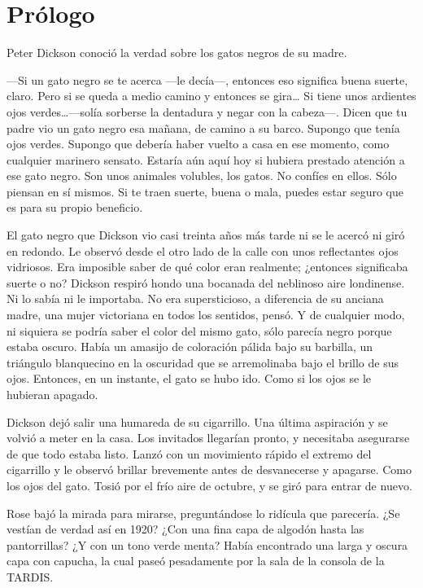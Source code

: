 \chapter*{Prólogo}

{Peter Dickson conoció la verdad sobre los gatos negros de su madre.}

{---Si un gato negro se te acerca ---le decía---, entonces eso
	significa buena suerte, claro. Pero si se queda a medio camino y
	entonces se gira\ldots{} Si tiene unos ardientes ojos
	verdes\ldots{}---solía sorberse la dentadura y negar con la
	cabeza---. Dicen que tu padre vio un gato negro esa mañana, de
	camino a su barco. Supongo que tenía ojos verdes. Supongo que debería
	haber vuelto a casa en ese momento, como cualquier marinero sensato.
	Estaría aún aquí hoy si hubiera prestado atención a ese gato negro. Son
	unos animales volubles, los gatos. No confíes en ellos. Sólo piensan en
	sí mismos. Si te traen suerte, buena o mala, puedes estar seguro que es
para su propio beneficio.}

{El gato negro que Dickson vio casi treinta años más tarde ni se le
	acercó ni giró en redondo. Le observó desde el otro lado de la calle con
	unos reflectantes ojos vidriosos. Era imposible saber de qué color eran
	realmente; ¿entonces significaba suerte o no? Dickson respiró hondo una
	bocanada del neblinoso aire londinense. Ni lo sabía ni le importaba. No
	era supersticioso, a diferencia de su anciana madre, una mujer
	victoriana en todos los sentidos, pensó. Y de cualquier modo, ni
	siquiera se podría saber el color del mismo gato, sólo parecía negro
	porque estaba oscuro. Había un amasijo de coloración pálida bajo su
	barbilla, un triángulo blanquecino en la oscuridad que se arremolinaba
	bajo el brillo de sus ojos. Entonces, en un instante, el gato se hubo
ido. Como si los ojos se le hubieran apagado.}

{Dickson dejó salir una humareda de su cigarrillo. Una última aspiración
	y se volvió a meter en la casa. Los invitados llegarían pronto, y
	necesitaba asegurarse de que todo estaba listo. Lanzó con un movimiento
	rápido el extremo del cigarrillo y le observó brillar brevemente antes
	de desvanecerse y apagarse. Como los ojos del gato. Tosió por el frío
aire de octubre, y se giró para entrar de nuevo.}

{Rose bajó la mirada para mirarse, preguntándose lo ridícula que
	parecería. ¿Se vestían de verdad así en 1920? ¿Con una fina capa de
	algodón hasta las pantorrillas? ¿Y con un tono verde menta? Había
	encontrado una larga y oscura capa con capucha, la cual paseó
pesadamente por la sala de la consola de la TARDIS.}

